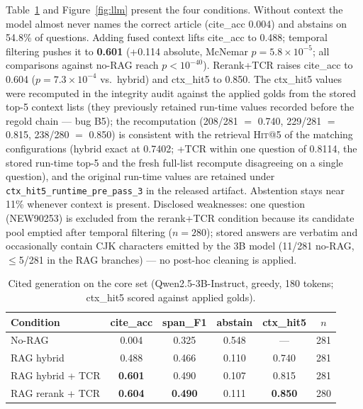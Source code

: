 \documentclass[10pt,a4paper,twocolumn]{article}
\newcommand{\hit}{\textsc{Hit}}
\newcommand{\code}[1]{\texttt{#1}}
\begin{document}
Table~\ref{tab:core-llm} and Figure~\ref{fig:llm} present the four conditions. Without context the model almost never names the correct article (cite\_acc 0.004) and abstains on 54.8\% of questions. Adding fused context lifts cite\_acc to 0.488; temporal filtering pushes it to \textbf{0.601} (+0.114 absolute, McNemar $p=5.8\times10^{-5}$; all comparisons against no-RAG reach $p<10^{-40}$). Rerank+TCR raises cite\_acc to 0.604 ($p=7.3\times10^{-4}$ vs.\ hybrid) and ctx\_hit5 to 0.850. The ctx\_hit5 values were recomputed in the integrity audit against the applied golds from the stored top-5 context lists (they previously retained run-time values recorded before the regold chain --- bug B5); the recomputation (208/281 $=$ 0.740, 229/281 $=$ 0.815, 238/280 $=$ 0.850) is consistent with the retrieval \hit{}@5 of the matching configurations (hybrid exact at 0.7402; +TCR within one question of 0.8114, the stored run-time top-5 and the fresh full-list recompute disagreeing on a single question), and the original run-time values are retained under \code{ctx\_hit5\_runtime\_pre\_pass\_3} in the released artifact. Abstention stays near 11\% whenever context is present. Disclosed weaknesses: one question (NEW90253) is excluded from the rerank+TCR condition because its candidate pool emptied after temporal filtering ($n{=}280$); stored answers are verbatim and occasionally contain CJK characters emitted by the 3B model (11/281 no-RAG, $\le$5/281 in the RAG branches) --- no post-hoc cleaning is applied.

\begin{table}[t]
\centering\footnotesize
\caption{Cited generation on the core set (Qwen2.5-3B-Instruct, greedy, 180 tokens; ctx\_hit5 scored against applied golds).}
\label{tab:core-llm}
\setlength{\tabcolsep}{2.6pt}
\begin{tabular}{lccccc}
\toprule
Condition & cite\_acc & span\_F1 & abstain & ctx\_hit5 & $n$ \\
\midrule
No-RAG & 0.004 & 0.325 & 0.548 & --- & 281 \\
RAG hybrid & 0.488 & 0.466 & 0.110 & 0.740 & 281 \\
RAG hybrid + TCR & \textbf{0.601} & 0.490 & 0.107 & 0.815 & 281 \\
RAG rerank + TCR & \textbf{0.604} & \textbf{0.490} & 0.111 & \textbf{0.850} & 280 \\
\bottomrule
\end{tabular}
\end{table}
\end{document}
